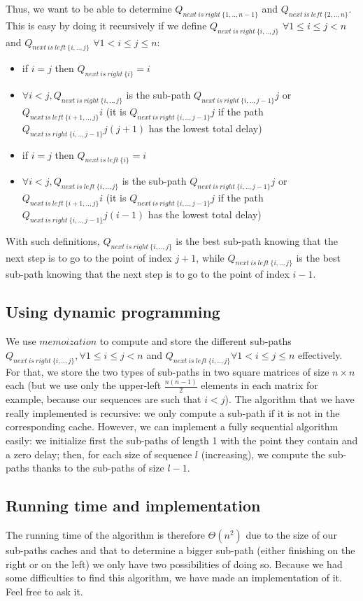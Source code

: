Thus, we want to be able to determine $Q_{next\ is\ right\ \{1,..,n-1\}}$ and $Q_{next\ is\ left\ \{2,..,n\}}$. This is easy by doing it recursively if we define $Q_{next\ is\ right\ \{i,..,j\}}$ $\forall 1 \leq i \leq j<n$ and $Q_{next\ is\ left\ \{i,..,j\}}$ $\forall 1<i \leq j \leq n$:
\begin{itemize}
\item if $i=j$ then $Q_{next\ is\ right\ \{i\}} = i$
\item $\forall i<j, Q_{next\ is\ right\ \{i,..,j\}}$ is the sub-path $Q_{next\ is\ right\ \{i,..,j-1\}}j$ or $Q_{next\ is\ left\ \{i+1,..,j\}}i$ (it is $Q_{next\ is\ right\ \{i,..,j-1\}}j$ if the path $Q_{next\ is\ right\ \{i,..,j-1\}}j(j+1)$ has the lowest total delay)    
\item if $i=j$ then $Q_{next\ is\ left\ \{i\}} = i$
\item $\forall i<j, Q_{next\ is\ left\ \{i,..,j\}}$ is the sub-path $Q_{next\ is\ right\ \{i,..,j-1\}}j$ or $Q_{next\ is\ left\ \{i+1,..,j\}}i$ (it is $Q_{next\ is\ right\ \{i,..,j-1\}}j$ if the path $Q_{next\ is\ right\ \{i,..,j-1\}}j(i-1)$ has the lowest total delay) 
\end{itemize}

With such definitions, $Q_{next\ is\ right\ \{i,..,j\}}$ is the best sub-path knowing that the next step is to go to the point of index $j+1$, while $Q_{next\ is\ left\ \{i,..,j\}}$ is the best sub-path knowing that the next step is to go to the point of index $i-1$.

\subsection*{Using dynamic programming}

We use $memoization$ to compute and store the different sub-paths $Q_{next\ is\ right\ \{i,..,j\}}, \forall 1 \leq i \leq j < n$ and $Q_{next\ is\ left\ \{i,..,j\}} \forall 1 < i \leq j \leq n$ effectively.
\newline
For that, we store the two types of sub-paths in two square matrices of size $n \times n$ each (but we use only the upper-left $\frac{n(n-1)}{2}$ elements in each matrix for example, because our sequences are such that $i<j$).
\newline
The algorithm that we have really implemented is recursive: we only compute a sub-path if it is not in the corresponding cache.
\newline
However, we can implement a fully sequential algorithm easily: we initialize first the sub-paths of length 1 with the point they contain and a zero delay; then, for each size of sequence $l$ (increasing), we compute the sub-paths thanks to the sub-paths of size $l-1$.

\subsection*{Running time and implementation}
The running time of the algorithm is therefore $\Theta(n^2)$ due to the size of our sub-paths caches and that to determine a bigger sub-path (either finishing on the right or on the left) we only have two possibilities of doing so.
Because we had some difficulties to find this algorithm, we have made an implementation of it. Feel free to ask it.